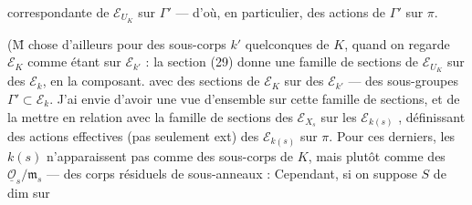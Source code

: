 correspondante de $\mathcal E_{U_K}$ sur $\Gamma'$ --- d'où, en particulier, des actions de $\Gamma'$ sur $\pi$.

(\={M} chose d'ailleurs pour des sous-corps $k'$ quelconques de $K$, quand on regarde $\mathcal E_K$ comme étant sur $\mathcal E_{k'}$ : la section (29) donne une famille de sections de $\mathcal E_{U_K}$ sur des $\mathcal E_k$,  en la composant. avec des sections de $\mathcal E_K$ sur des $\mathcal E_{k'}$ --- des sous-groupes $\Gamma'\subset\mathcal E_k$. J'ai envie d'avoir une vue d'ensemble sur cette famille de sections, et de la mettre en relation avec la famille de sections des $\mathcal E_{X_s}$ sur les $\mathcal E_{k(s)}$ , définissant des actions effectives (pas seulement ext) des $\mathcal E_{k(s)}$ sur $\pi$. Pour ces derniers, les $k(s)$ n'apparaissent pas comme des sous-corps de $K$, mais plutôt comme des $\underline{\mathcal O}_s/\mathfrak m_s$ --- des corps résiduels de sous-anneaux : Cependant, si on suppose $S$ de dim   sur
